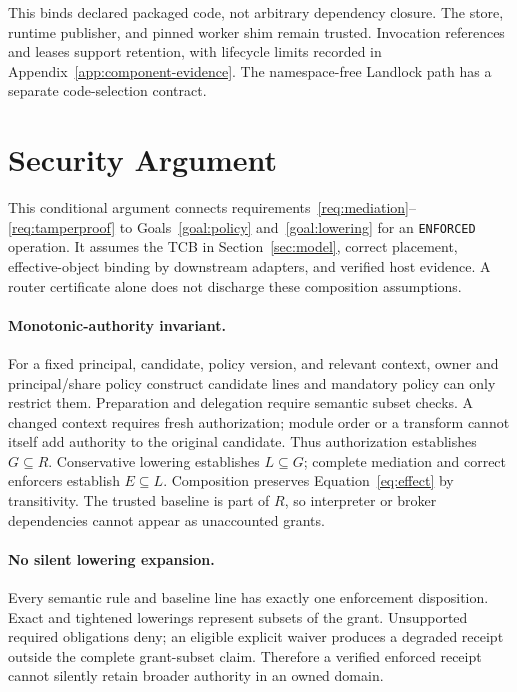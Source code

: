 \documentclass[letterpaper,twocolumn,10pt]{article}
\newcommand{\code}[1]{\texttt{#1}}
\begin{document}
This binds declared packaged code, not arbitrary dependency closure. The store,
runtime publisher, and pinned worker shim remain trusted. Invocation references
and leases support retention, with lifecycle limits recorded in
Appendix~\ref{app:component-evidence}. The namespace-free Landlock path has a
separate code-selection contract.

\section{Security Argument}
\label{sec:argument}

This conditional argument connects requirements~\ref{req:mediation}--\ref{req:tamperproof}
to Goals~\ref{goal:policy} and~\ref{goal:lowering} for an \code{ENFORCED}
operation. It assumes the TCB in Section~\ref{sec:model}, correct placement,
effective-object binding by downstream adapters, and verified host evidence.
A router certificate alone does not discharge these composition assumptions.

\paragraph{Monotonic-authority invariant.}
For a fixed principal, candidate, policy version, and relevant context, owner
and principal/share policy construct candidate lines and mandatory policy can
only restrict them. Preparation and delegation require semantic subset checks.
A changed context requires fresh authorization; module order or a transform
cannot itself add authority to the original candidate. Thus authorization
establishes $G\subseteq R$. Conservative lowering establishes $L\subseteq G$;
complete mediation and correct enforcers establish $E\subseteq L$. Composition
preserves Equation~\ref{eq:effect} by transitivity. The trusted baseline is part
of $R$, so interpreter or broker dependencies cannot appear as unaccounted grants.

\paragraph{No silent lowering expansion.}
Every semantic rule and baseline line has exactly one enforcement disposition.
Exact and tightened lowerings represent subsets of the grant. Unsupported
required obligations deny; an eligible explicit waiver produces a degraded
receipt outside the complete grant-subset claim. Therefore a
verified enforced receipt cannot silently retain broader authority in an owned
domain.
\end{document}
